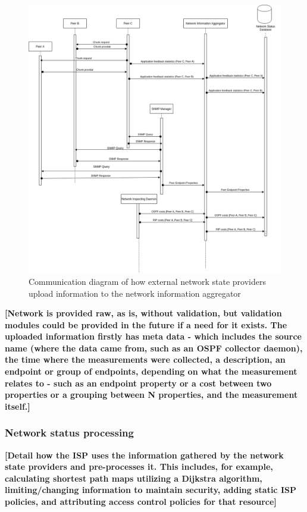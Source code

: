\begin{figure}[!h]
        \centering
        \includegraphics[scale=0.3]{img/info-provisioning-providers.png}
        \caption{Communication diagram of how external network state providers upload information to the network information aggregator}
        \label{fig:architecture-network}
\end{figure}


    \textbf{[Network is provided raw, as is, without validation, but validation modules could be provided in the future if a need for it exists. The uploaded information firstly has meta data - which includes the source name (where the data came from, such as an OSPF collector daemon), the time where the measurements were collected, a description, an endpoint or group of endpoints, depending on what the measurement relates to - such as an endpoint property or a cost between two properties or a grouping between N properties, and the measurement itself.]}


\subsubsection{Network status processing}

    \textbf{[Detail how the ISP uses the information gathered by the network state providers and pre-processes it. This includes, for example, calculating shortest path maps utilizing a Dijkstra algorithm, limiting/changing information to maintain security, adding static ISP policies, and attributing access control policies for that resource]}

